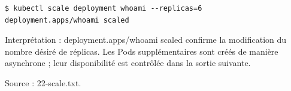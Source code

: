 \documentclass[11pt,a4paper]{article}
\begin{document}
\par\medskip\noindent\begin{minipage}{\linewidth}
\par\vspace{4pt}\noindent\begin{minipage}{\linewidth}
\begin{Verbatim}[breaklines=true,breakanywhere=true,fontsize=\footnotesize,frame=single,framesep=8pt,rulecolor=\color{teal}]
$ kubectl scale deployment whoami --replicas=6
deployment.apps/whoami scaled
\end{Verbatim}
\end{minipage}\par\vspace{6pt}

Interprétation : deployment.apps/whoami scaled confirme la modification du nombre désiré de réplicas. Les Pods supplémentaires sont créés de manière asynchrone ; leur disponibilité est contrôlée dans la sortie suivante.

{\footnotesize\color{teal} Source : 22-scale.txt.\par}
\end{minipage}\par\medskip
\end{document}
